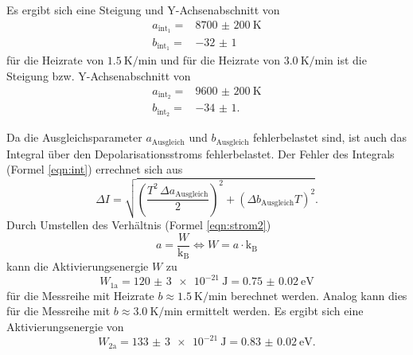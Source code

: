 Es ergibt sich eine Steigung und Y-Achsenabschnitt von
\begin{align*}
  a_{\text{int}_1} =& \SI{8700(200)}{\kelvin} \\
  b_{\text{int}_1} =& \num{-32(1)}
\end{align*}
für die Heizrate von $\SI{1.5}{\kelvin\per\minute}$
und für die Heizrate von $\SI{3.0}{\kelvin\per\minute}$ ist die
Steigung bzw. Y-Achsenabschnitt von
\begin{align*}
  a_{\text{int}_2} =& \SI{9600(200)}{\kelvin} \\
  b_{\text{int}_2} =& \num{-34(1)}.
\end{align*}

Da die Ausgleichsparameter $a_\text{Ausgleich}$ und $b_\text{Ausgleich}$ fehlerbelastet
sind, ist auch das Integral über den Depolarisationsstroms fehlerbelastet.
Der Fehler des Integrals (Formel \ref{eqn:int}) errechnet sich aus
\begin{equation}
\Delta I =  \sqrt{\left(\frac{T^2 \, \Delta a_\text{Ausgleich}}{2}\right)^2 +
  (\Delta b_\text{Ausgleich} T)^2}.
\end{equation}
Durch Umstellen des Verhältnis (Formel \ref{eqn:strom2})
\begin{equation}
  a = \frac{W}{\text{k}_\text{B}} \iff W = a \cdot \text{k}_\text{B}
  \label{eqn:verhaltnis}
\end{equation}
kann die Aktivierungsenergie $W$ zu
\begin{equation*}
  W_\text{1a} = \SI{120(3)e-21}{\joule} = \SI{0.75(2)}{\electronvolt}
\end{equation*}
für die Messreihe mit Heizrate $b \approx \SI{1.5}{\kelvin\per\minute}$
berechnet werden.
Analog kann dies für die Messreihe mit $b \approx \SI{3.0}{\kelvin\per\minute}$
ermittelt werden.
Es ergibt sich eine Aktivierungsenergie von
\begin{equation*}
W_\text{2a} =  \SI{133(3)e-21}{\joule} = \SI{0.83(2)}{\electronvolt}.
\end{equation*}
